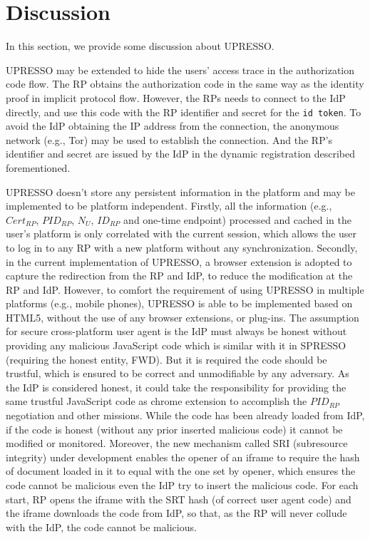 \section{Discussion}
\label{sec:discussion}
In this section, we provide some discussion about UPRESSO.

 UPRESSO may be extended to hide the users' access trace in  the authorization code flow. The RP obtains the authorization code in the same way as the  identity proof in implicit protocol flow. However, the RPs needs to connect to the IdP directly, and  use this code with  the RP identifier and secret for the \verb+id token+. To avoid the IdP obtaining the IP address from the connection, the anonymous network (e.g., Tor) may be used to establish the connection. And the RP's identifier and secret are issued by the IdP in the dynamic registration described forementioned.


 UPRESSO doesn't store any persistent information in the platform and may be implemented to be platform independent. Firstly, all the information (e.g., $Cert_{RP}$, $PID_{RP}$, $N_U$, $ID_{RP}$ and one-time endpoint) processed and cached in the user's platform is only correlated with the current session, which allows the user to log in to any RP with a new platform without any synchronization. Secondly, in the current implementation of UPRESSO, a browser extension is adopted to capture the redirection from the RP and IdP, to reduce the modification at the RP and IdP.
However, to comfort the requirement of using UPRESSO in multiple platforms (e.g., mobile phones), UPRESSO is able to be implemented based on HTML5, without the use of any browser extensions, or plug-ins. The assumption for secure cross-platform user agent is the IdP must always be honest without providing any malicious JavaScript code which is similar with it in SPRESSO (requiring the honest entity, FWD). But it is required the code should be trustful, which is ensured to be correct and unmodifiable by any adversary. As the IdP is considered honest, it could take the responsibility for providing the same trustful JavaScript code as chrome extension to accomplish the $PID_{RP}$ negotiation and other missions. While the code has been already loaded from IdP, if the code is honest (without any prior inserted malicious code) it cannot be modified or monitored. Moreover, the new mechanism called SRI (subresource integrity) under development enables the opener of an iframe to require the hash of document loaded in it to equal with the one set by opener, which ensures the code cannot be malicious even the IdP try to insert the malicious code. For each start, RP opens the iframe with the SRT hash (of correct user agent code) and the iframe downloads the code from IdP, so that, as the RP will never collude with the IdP, the code cannot be malicious.

